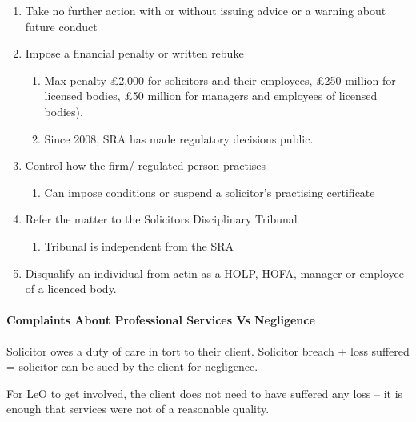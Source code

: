 \documentclass[
]{article}
\providecommand{\tightlist}{%
  \setlength{\itemsep}{0pt}\setlength{\parskip}{0pt}}
\begin{document}
\begin{enumerate}
\def\labelenumi{\arabic{enumi}.}
\tightlist
\item
  Take no further action with or without issuing advice or a warning
  about future conduct
\item
  Impose a financial penalty or written rebuke

  \begin{enumerate}
  \def\labelenumii{\arabic{enumii}.}
  \tightlist
  \item
    Max penalty £2,000 for solicitors and their employees, £250 million
    for licensed bodies, £50 million for managers and employees of
    licensed bodies).
  \item
    Since 2008, SRA has made regulatory decisions public.
  \end{enumerate}
\item
  Control how the firm/ regulated person practises

  \begin{enumerate}
  \def\labelenumii{\arabic{enumii}.}
  \tightlist
  \item
    Can impose conditions or suspend a solicitor's practising
    certificate
  \end{enumerate}
\item
  Refer the matter to the Solicitors Disciplinary Tribunal

  \begin{enumerate}
  \def\labelenumii{\arabic{enumii}.}
  \tightlist
  \item
    Tribunal is independent from the SRA
  \end{enumerate}
\item
  Disqualify an individual from actin as a HOLP, HOFA, manager or
  employee of a licenced body.
\end{enumerate}

\hypertarget{complaints-about-professional-services-vs-negligence}{%
\paragraph{Complaints About Professional Services Vs
Negligence}\label{complaints-about-professional-services-vs-negligence}}

Solicitor owes a duty of care in tort to their client. Solicitor breach
+ loss suffered = solicitor can be sued by the client for negligence.

For LeO to get involved, the client does not need to have suffered any
loss -- it is enough that services were not of a reasonable quality.
\end{document}
